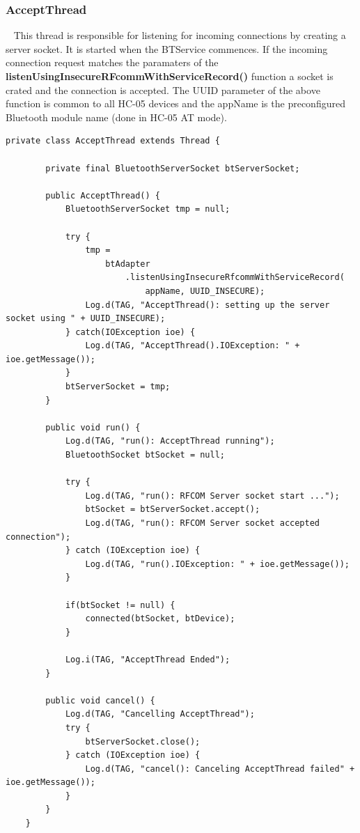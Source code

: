 \documentclass[12pt,a4paper]{article}
\begin{document}
    \subsubsection*{AcceptThread}~\cite{bib:acceptThread}
    This thread is responsible for listening for incoming connections by creating a server socket. It is started when the BTService commences. If the incoming connection request matches the paramaters of the {\bfseries listenUsingInsecureRFcommWithServiceRecord()} function a socket is crated and the connection is accepted. The UUID parameter of the above function is common to all HC-05 devices and the appName is the preconfigured Bluetooth module name (done in HC-05 AT mode).
    
   \begin{lstlisting}[label={lst:acceptThread}, caption=AcceptThread class]
    private class AcceptThread extends Thread {

        private final BluetoothServerSocket btServerSocket;

        public AcceptThread() {
            BluetoothServerSocket tmp = null;

            try {
                tmp = 
                    btAdapter
                        .listenUsingInsecureRfcommWithServiceRecord(
                            appName, UUID_INSECURE);
                Log.d(TAG, "AcceptThread(): setting up the server socket using " + UUID_INSECURE);
            } catch(IOException ioe) {
                Log.d(TAG, "AcceptThread().IOException: " + ioe.getMessage());
            }
            btServerSocket = tmp;
        }

        public void run() {
            Log.d(TAG, "run(): AcceptThread running");
            BluetoothSocket btSocket = null;

            try {
                Log.d(TAG, "run(): RFCOM Server socket start ...");
                btSocket = btServerSocket.accept();
                Log.d(TAG, "run(): RFCOM Server socket accepted connection");
            } catch (IOException ioe) {
                Log.d(TAG, "run().IOException: " + ioe.getMessage());
            }

            if(btSocket != null) {
                connected(btSocket, btDevice);
            }

            Log.i(TAG, "AcceptThread Ended");
        }

        public void cancel() {
            Log.d(TAG, "Cancelling AcceptThread");
            try {
                btServerSocket.close();
            } catch (IOException ioe) {
                Log.d(TAG, "cancel(): Canceling AcceptThread failed" + ioe.getMessage());
            }
        }
    }
    \end{lstlisting}
    
\end{document}
